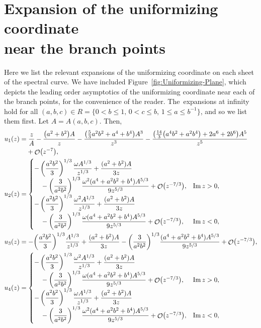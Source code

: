 \documentclass[10pt,a4paper]{amsart}
\DeclareMathOperator{\OO}{\mathcal{O}}
\numberwithin{equation}{section}
\begin{document}
\section{Expansion of the uniformizing coordinate \\ near the branch points} \label{Appendix-A}
Here we list the relevant expansions of the uniformizing coordinate on each sheet of the spectral curve. We have included Figure~\ref{fig:Uniformizing-Plane}, which depicts the leading order asymptotics of the uniformizing coordinate near each of the branch points, for the convenience of the reader. The~expansions at infinity hold for all $(a,b,c) \in R = \{0<b\leq 1,\, 0< c\leq b,\, 1 \leq a \leq b^{-1}\}$, and so we list them first. Let $A= A(a,b,c)$. Then,
\begin{align*}
 &u_1(z)= \frac{z}{A} - \frac{\bigl(a^2+b^2\bigr)A}{z} - \frac{\bigl(\frac{5}{3}a^2b^2 + a^4 + b^4\bigr)A^3}{z^3} - \frac{\bigl(\frac{14}{3}\bigl(a^4b^2 + a^2b^4\bigr) + 2a^6+ 2b^6\bigr)A^5}{z^5}\\
 & \hphantom{u_1(z)=}{}
 + \OO\bigl(z^{-7}\bigr),\\
 &u_2(z)=
 \begin{cases}
 -\left(\dfrac{a^2b^2}{3}\right)^{1/3} \dfrac{\omega A^{1/3}}{z^{1/3}} + \dfrac{(a^2+b^2)A}{3z} &\\
 \quad{}- \left(\dfrac{3}{a^2b^2}\right)^{1/3} \dfrac{\omega^2(a^4+a^2b^2+b^4)A^{5/3}}{9z^{5/3}} + \OO\bigl(z^{-7/3}\bigr), & \operatorname{Im}z >0,\\[1mm]
 -\left(\dfrac{a^2b^2}{3}\right)^{1/3} \dfrac{\omega^2 A^{1/3}}{z^{1/3}} + \dfrac{(a^2+b^2)A}{3z} &\\
 \quad{} - \left(\dfrac{3}{a^2b^2}\right)^{1/3} \dfrac{\omega(a^4+a^2b^2+b^4)A^{5/3}}{9z^{5/3}} + \OO\bigl(z^{-7/3}\bigr), & \operatorname{Im}z <0,
 \end{cases}\\
 &u_3(z)= -\biggl(\frac{a^2b^2}{3}\biggr)^{1/3} \frac{A^{1/3}}{z^{1/3}} + \frac{(a^2+b^2)A}{3z} - \biggl(\frac{3}{a^2b^2}\biggr)^{1/3} \frac{(a^4+a^2b^2+b^4)A^{5/3}}{9z^{5/3}} + \OO\bigl(z^{-7/3}\bigr),\\
 &u_4(z)=
 \begin{cases}
 -\left(\dfrac{a^2b^2}{3}\right)^{1/3} \dfrac{\omega^2 A^{1/3}}{z^{1/3}} + \dfrac{(a^2+b^2)A}{3z} &\\
 \quad{}- \left(\dfrac{3}{a^2b^2}\right)^{1/3} \dfrac{\omega(a^4+a^2b^2+b^4)A^{5/3}}{9z^{5/3}} + \OO\bigl(z^{-7/3}\bigr), & \operatorname{Im}z >0,\\[1mm]
 -\left(\dfrac{a^2b^2}{3}\right)^{1/3} \dfrac{\omega A^{1/3}}{z^{1/3}} + \dfrac{(a^2+b^2)A}{3z} &\\
 \quad{}- \left(\dfrac{3}{a^2b^2}\right)^{1/3} \dfrac{\omega^2(a^4+a^2b^2+b^4)A^{5/3}}{9z^{5/3}} + \OO\bigl(z^{-7/3}\bigr), & \operatorname{Im}z <0,
 \end{cases}
\end{align*}
\end{document}
